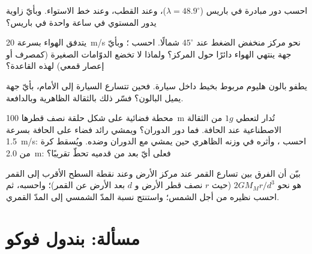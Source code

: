 \begin{exercise}[$\star\star$]\label{exo:b1:non-inertial-frames:8}
احسب دور مبادرة  في باريس ($\lambda = 48.9^\circ$)،
وعند القطب، وعند خط الاستواء. وبأيّ زاوية يدور المستوي
في ساعة واحدة في باريس؟
\end{exercise}

\begin{exercise}[$\star\star$]\label{exo:b1:non-inertial-frames:9}
يتدفق الهواء بسرعة \qty{20}{m/s} نحو مركز منخفض الضغط عند $45^\circ$
شمالًا. احسب ؛ وبأيّ جهة ينتهي الهواء
دائرًا حول المركز؟ ولماذا لا تخضع الدوّامات الصغيرة (كمصرف أو إعصار قمعي)
لهذه القاعدة؟
\end{exercise}

\begin{exercise}[$\star\star\star$]\label{exo:b1:non-inertial-frames:10}
يطفو بالون هليوم مربوط بخيط داخل سيارة. فحين
تتسارع السيارة إلى الأمام، بأيّ جهة يميل البالون؟ فسّر ذلك بالثقالة
الظاهرية وبالدافعة.
\end{exercise}

\begin{exercise}[$\star\star\star$]\label{exo:b1:non-inertial-frames:11}
محطة فضائية على شكل حلقة نصف قطرها \qty{100}{m} تُدار لتعطي $1g$ من
الثقالة الاصطناعية عند الحافة. فما دور الدوران؟ ويمشي رائد فضاء على
الحافة بسرعة \qty{1.5}{m/s}: احسب ، وأثره في
وزنه الظاهري حين يمشي مع الدوران وضده. ويُسقط
كرة من \qty{2.0}{m}: فعلى أيّ بعد من قدميه تحطّ تقريبًا؟
\end{exercise}

\begin{exercise}[$\star\star\star$]\label{exo:b1:non-inertial-frames:12}
بيّن أن الفرق بين تسارع  القمر
عند مركز الأرض وعند نقطة السطح الأقرب إلى القمر هو
نحو $2GM_Mr/d^3$ (حيث $r$ نصف قطر الأرض و $d$ بعد الأرض عن القمر)؛
واحسبه، ثم احسب نظيره من أجل الشمس؛ واستنتج نسبة المدّ الشمسي إلى
المدّ القمري.
\end{exercise}

\section{مسألة: بندول فوكو}

